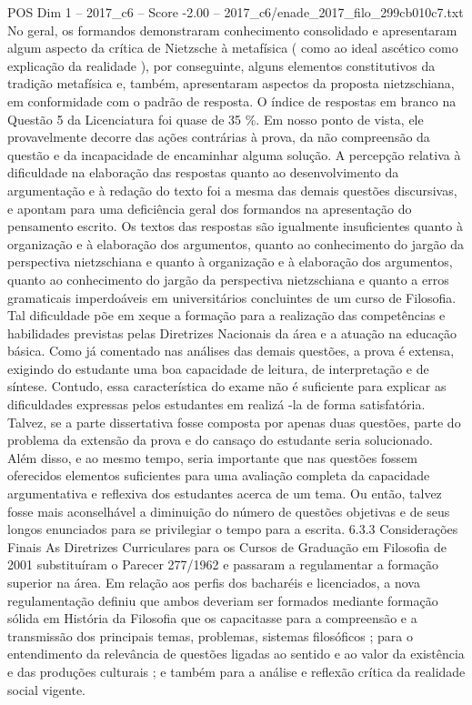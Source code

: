 \begin{textsample}{POS Dim 1 – 2017\_c6 – Score -2.00 – 2017\_c6/enade\_2017\_filo\_299cb010c7.txt}
No geral, os formandos demonstraram conhecimento consolidado e apresentaram algum aspecto da crítica de Nietzsche à metafísica ( como ao ideal ascético como explicação da realidade ), por conseguinte, alguns elementos constitutivos da tradição metafísica e, também, apresentaram aspectos da proposta nietzschiana, em conformidade com o padrão de resposta.
O índice de respostas em branco na Questão 5 da Licenciatura foi quase de 35 \%.
Em nosso ponto de vista, ele provavelmente decorre das ações contrárias à prova, da não compreensão da questão e da incapacidade de encaminhar alguma solução.
A percepção relativa à dificuldade na elaboração das respostas quanto ao desenvolvimento da argumentação e à redação do texto foi a mesma das demais questões discursivas, e apontam para uma deficiência geral dos formandos na apresentação do pensamento escrito.
Os textos das respostas são igualmente insuficientes quanto à organização e à elaboração dos argumentos, quanto ao conhecimento do jargão da perspectiva nietzschiana e quanto à organização e à elaboração dos argumentos, quanto ao conhecimento do jargão da perspectiva nietzschiana e quanto a erros gramaticais imperdoáveis em universitários concluintes de um curso de Filosofia.
Tal dificuldade põe em xeque a formação para a realização das competências e habilidades previstas pelas Diretrizes Nacionais da área e a atuação na educação básica.
Como já comentado nas análises das demais questões, a prova é extensa, exigindo do estudante uma boa capacidade de leitura, de interpretação e de síntese.
Contudo, essa característica do exame não é suficiente para explicar as dificuldades expressas pelos estudantes em realizá -la de forma satisfatória.
Talvez, se a parte dissertativa fosse composta por apenas duas questões, parte do problema da extensão da prova e do cansaço do estudante seria solucionado.
Além disso, e ao mesmo tempo, seria importante que nas questões fossem oferecidos elementos suficientes para uma avaliação completa da capacidade argumentativa e reflexiva dos estudantes acerca de um tema.
Ou então, talvez fosse mais aconselhável a diminuição do número de questões objetivas e de seus longos enunciados para se privilegiar o tempo para a escrita. 6.3.3 Considerações Finais As Diretrizes Curriculares para os Cursos de Graduação em Filosofia de 2001 substituíram o Parecer 277/1962 e passaram a regulamentar a formação superior na área.
Em relação aos perfis dos bacharéis e licenciados, a nova regulamentação definiu que ambos deveriam ser formados mediante formação sólida em História da Filosofia que os capacitasse para a compreensão e a transmissão dos principais temas, problemas, sistemas filosóficos ; para o entendimento da relevância de questões ligadas ao sentido e ao valor da existência e das produções culturais ; e também para a análise e reflexão crítica da realidade social vigente.

\end{textsample}
